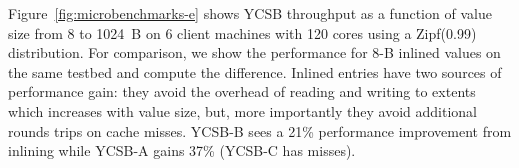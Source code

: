 Figure~\ref{fig:microbenchmarks-e} shows YCSB throughput as a function of
value size from 8 to 1024~B on 6 client machines with 120 cores using a
Zipf(0.99) distribution.  For
comparison, we show the performance for 8-B inlined values on the same
testbed and compute the difference.  
Inlined entries have two sources of performance gain: they avoid the overhead of reading and
writing to extents which increases with value size, but, more importantly they avoid additional rounds trips on cache
misses. YCSB-B sees a 21\% performance improvement from inlining while YCSB-A gains 37\% (YCSB-C has misses).
